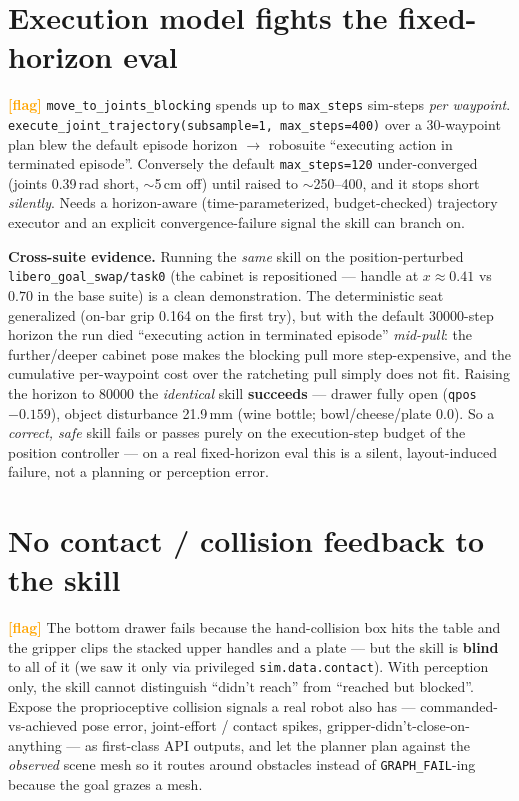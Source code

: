 \documentclass[11pt]{article}
\newcommand{\flag}{\textcolor{orange}{\textbf{[flag]}}}
\newcommand{\code}[1]{\texttt{#1}}
\begin{document}
\section{Execution model fights the fixed-horizon eval}
\flag{} \code{move\_to\_joints\_blocking} spends up to \code{max\_steps} sim-steps
\emph{per waypoint}. \code{execute\_joint\_trajectory(subsample=1, max\_steps=400)} over a
30-waypoint plan blew the default episode horizon $\to$ robosuite ``executing action in
terminated episode''. Conversely the default \code{max\_steps=120} under-converged (joints
0.39\,rad short, $\sim$5\,cm off) until raised to $\sim$250--400, and it stops short
\emph{silently}. Needs a horizon-aware (time-parameterized, budget-checked) trajectory
executor and an explicit convergence-failure signal the skill can branch on.

\medskip\noindent\textbf{Cross-suite evidence.} Running the \emph{same} skill on the
position-perturbed \code{libero\_goal\_swap/task0} (the cabinet is repositioned ---
handle at $x\!\approx\!0.41$ vs $0.70$ in the base suite) is a clean demonstration. The
deterministic seat generalized (on-bar grip 0.164 on the first try), but with the default
30000-step horizon the run died ``executing action in terminated episode'' \emph{mid-pull}:
the further/deeper cabinet pose makes the blocking pull more step-expensive, and the
cumulative per-waypoint cost over the ratcheting pull simply does not fit. Raising the
horizon to 80000 the \emph{identical} skill \textbf{succeeds} --- drawer fully open
(\code{qpos} $-0.159$), object disturbance 21.9\,mm (wine bottle; bowl/cheese/plate
$0.0$). So a \emph{correct, safe} skill fails or passes purely on the execution-step budget
of the position controller --- on a real fixed-horizon eval this is a silent, layout-induced
failure, not a planning or perception error.

\section{No contact / collision feedback to the skill}
\flag{} The bottom drawer fails because the hand-collision box hits the table and the gripper
clips the stacked upper handles and a plate --- but the skill is \textbf{blind} to all of it
(we saw it only via privileged \code{sim.data.contact}). With perception only, the skill
cannot distinguish ``didn't reach'' from ``reached but blocked''. Expose the proprioceptive
collision signals a real robot also has --- commanded-vs-achieved pose error, joint-effort /
contact spikes, gripper-didn't-close-on-anything --- as first-class API outputs, and let the
planner plan against the \emph{observed} scene mesh so it routes around obstacles instead of
\code{GRAPH\_FAIL}-ing because the goal grazes a mesh.
\end{document}
